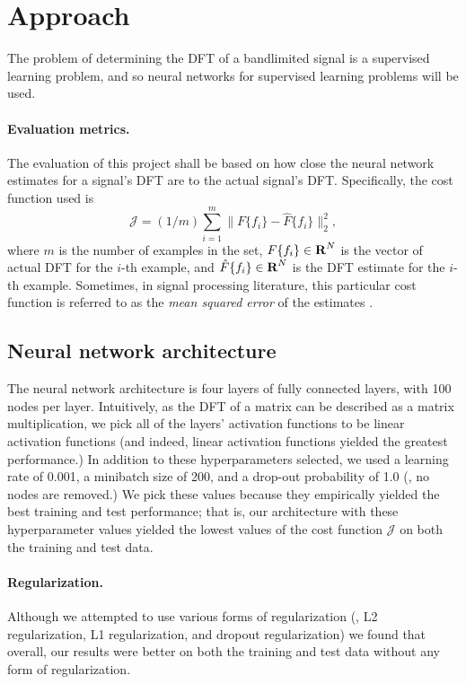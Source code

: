\documentclass[12pt]{article}
\begin{document}
\section{Approach} \label{s-approach}
The problem of determining the DFT of a bandlimited signal is a supervised learning problem, and so
neural networks for supervised learning problems will be used.

\paragraph{Evaluation metrics.}
The evaluation of this project shall be based on how close the neural network estimates for 
a signal's DFT are to the actual signal's DFT. Specifically, the cost function used is
\[
\mathcal J = (1/m) \sum_{i = 1}^{m} \|F\{f_i\} - \hat{F}\{f_i\} \|_2^2,
\]
where $m$ is the number of examples in the set, $F\{f_i\} \in {\mbox{\bf R}}^N$ is the vector of actual DFT 
for the $i$-th example, and $\hat{F}\{f_i\} \in {\mbox{\bf R}}^N$ is the DFT estimate for the $i$-th example. 
Sometimes, in signal processing literature, this particular cost function is referred to as the 
\emph{mean squared error} of the estimates \cite{DG:10}.

\subsection{Neural network architecture} The neural network architecture is four layers of 
fully connected layers, with 100 nodes per layer. Intuitively, as the DFT of a matrix can be described 
as a matrix multiplication, we pick all of the layers' activation functions to be linear activation 
functions (and indeed, linear activation functions yielded the greatest performance.) In addition to these 
hyperparameters selected, we used a learning rate of 0.001, a minibatch size of 200, and a drop-out 
probability of 1.0 (\ie, no nodes are removed.) We pick these values because they empirically yielded 
the best training and test performance; that is, our architecture with these hyperparameter values 
yielded the lowest values of the cost function $\mathcal J$ on both the training and test data.

\paragraph{Regularization.} Although we attempted to use various forms of regularization (\ie, L2 regularization, 
L1 regularization, and dropout regularization) we found that overall, our results were better on both the training 
and test data without any form of regularization.
\end{document}
